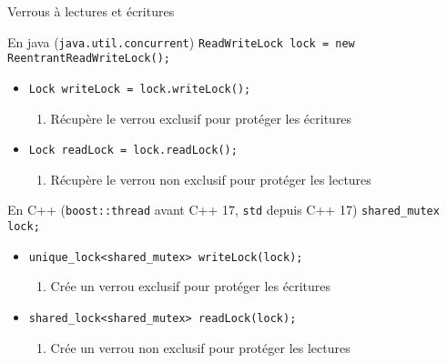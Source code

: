 
\begingroup

\begin{frame}[fragile]{Verrous à lectures et écritures}

  \vfill
  \begin{block}{En java (\lstinline{java.util.concurrent})}
    \lstinline{ReadWriteLock lock = new ReentrantReadWriteLock();}
    \begin{itemize}
    \item \lstinline{Lock writeLock = lock.writeLock();}
      \begin{enumerate}
      \item Récupère le verrou \alert{exclusif} pour protéger les écritures
      \end{enumerate}
    \item \lstinline{Lock readLock = lock.readLock();}
      \begin{enumerate}
      \item Récupère le verrou \alert{non exclusif} pour protéger les lectures
      \end{enumerate}
    \end{itemize}
  \end{block}

  \vfill
  \begin{block}{En C++ (\lstinline{boost::thread} avant C++ 17, \lstinline{std} depuis C++ 17)}
    \lstinline{shared_mutex lock;} 
    \begin{itemize}
    \item \lstinline{unique_lock<shared_mutex> writeLock(lock);}
      \begin{enumerate}
      \item Crée un verrou \alert{exclusif} pour protéger les écritures
      \end{enumerate}
    \item \lstinline{shared_lock<shared_mutex> readLock(lock);}
      \begin{enumerate}
      \item Crée un verrou \alert{non exclusif} pour protéger les lectures
      \end{enumerate}
    \end{itemize}
  \end{block}
  \vfill

\end{frame}

\endgroup
\endinput
